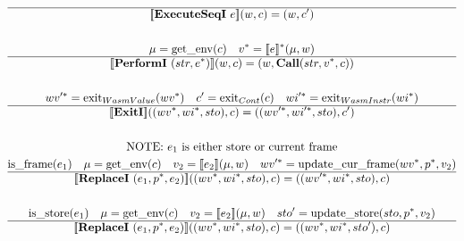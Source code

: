 \begin{gather*}
  \hline
  \sem{\executeseqi ~ e}(w, c) = (w, c') \\
%
\newline \\
  \mu = \getenv(c) \quad
  \seq v = \seq{\sem{e}}(\mu, w) \\
  \hline
  \sem{\performi ~ (str, \seq e)}(w, c) = (w, \call (str, \seq v, c)) \\
%
\newline \\
  \seq{wv'} = \exit_{WasmValue}(\seq{wv}) \quad
  c' = \exit_{Cont}(c) \quad
  \seq{wi'} = \exit_{WasmInstr}(\seq{wi}) \\
  \hline
  \sem{\exiti}((\seq{wv}, \seq{wi}, sto), c)
  =
  ((\seq{wv'}, \seq{wi'}, sto), c') \\
%
\newline \\
\text{NOTE: $e_1$ is either store or current frame} \\
  \isframe(e_1) \quad
  \mu = \getenv(c) \quad
  v_2 = \sem{e_2}(\mu, w) \quad
  \seq{wv'} = \updatecurframe(\seq{wv}, \seq p, v_2) \\
  \hline
  \sem{\replacei ~ (e_1, \seq p, e_2)}((\seq{wv}, \seq{wi}, sto), c)
  = ((\seq{wv'}, \seq{wi}, sto), c) \\
%
\newline \\
  \isstore(e_1) \quad
  \mu = \getenv(c) \quad
  v_2 = \sem{e_2}(\mu, w) \quad
  sto' = \updatestore(sto, \seq p, v_2) \\
  \hline
  \sem{\replacei ~ (e_1, \seq p, e_2)}((\seq{wv}, \seq{wi}, sto), c)
  = ((\seq{wv}, \seq{wi}, sto'), c) \\
\newline \\
\end{gather*}





